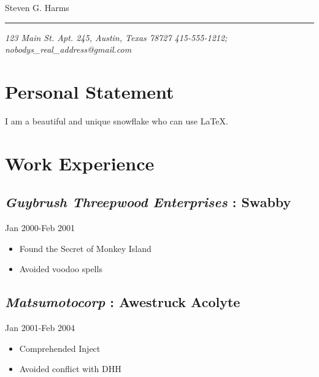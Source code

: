 \documentclass[]{article}
\begin{document}
\ifpdf
{}
\else
{}
\fi


\begin{center}
    \Huge Steven G. Harms
\end{center}
\vspace{-8pt} \rule{\textwidth}{1pt}

\vspace{-1pt} {\small\itshape 123 Main St. Apt. 245, Austin, Texas 78727  \hfill 415-555-1212; nobodys\_real\_address@gmail.com}





  \section*{ Personal Statement}
  I am a beautiful and unique snowflake who can use \LaTeX.


\section*{Work Experience}
\label{sec: work_experience}
\subsection*{\textit{Guybrush Threepwood Enterprises} : \textbf{Swabby}}
  \label{_guybrushthreepwoodenterprises_swabby}
  \textsf{Jan 2000-Feb 2001}
      
\begin{itemize}
    \item Found the Secret of Monkey Island
    \item Avoided voodoo spells
\end{itemize}
       
\subsection*{\textit{Matsumotocorp} : \textbf{Awestruck Acolyte}}
  \label{_matsumotocorp_awestruckacolyte}
  \textsf{Jan 2001-Feb 2004}
      
\begin{itemize}
    \item Comprehended Inject
    \item Avoided conflict with DHH
\end{itemize}
       
\end{document}
